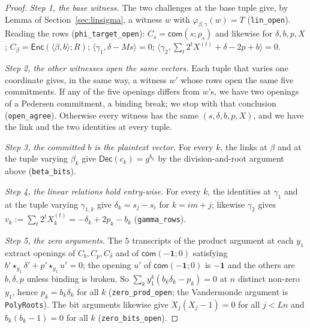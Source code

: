 \documentclass[11pt,a4paper]{article}
\newcommand{\Enc}{\mathsf{Enc}}
\newcommand{\Dec}{\mathsf{Dec}}
\newcommand{\com}{\mathsf{com}}
\newcommand{\rocq}[1]{\texttt{#1}}
\theoremstyle{remark}
\begin{document}
\begin{proof}
\emph{Step 1, the base witness.} The two challenges at the base tuple give,
by Lemma of Section~\ref{sec:linsigma}, a witness $w$ with
$\varphi_{\beta,\gamma}(w) = T$ (\rocq{lin\_open}). Reading the rows
(\rocq{phi\_target\_open}): $C_s = \com(s; \rho_s)$ and likewise for
$\delta, b, p, X$; $C_\beta = \Enc(\langle \beta, b \rangle; R)$; $\langle
\gamma_1, \delta - Ms \rangle = 0$; $\langle \gamma_2, \sum_t 2^t X^{(t)} +
\delta - 2p + b \rangle = 0$.

\emph{Step 2, the other witnesses open the same vectors.} Each tuple that
varies one coordinate gives, in the same way, a witness $w'$ whose rows
open the same five commitments. If any of the five openings differs from
$w$'s, we have two openings of a Pedersen commitment, a binding break; we
stop with that conclusion (\rocq{open\_agree}). Otherwise every witness
has the same $(s, \delta, b, p, X)$, and we have the link and the two
identities at every tuple.

\emph{Step 3, the committed $b$ is the plaintext vector.} For every $k$,
the links at $\beta$ and at the tuple varying $\beta_k$ give $\Dec(c_k) =
g^{b_k}$ by the division-and-root argument above (\rocq{beta\_bits}).

\emph{Step 4, the linear relations hold entry-wise.} For every $k$, the
identities at $\gamma_1$ and at the tuple varying $\gamma_{1,k}$ give
$\delta_k = s_j - s_i$ for $k = im + j$; likewise $\gamma_2$ gives $v_k :=
\sum_t 2^t X^{(t)}_k = -\delta_k + 2 p_k - b_k$ (\rocq{gamma\_rows}).

\emph{Step 5, the zero arguments.} The $5$ transcripts of the product
argument at each $y_1$ extract openings of $C_b, C_p, C_\delta$ and of
$\com(-\mathbf{1}; 0)$ satisfying $b' \star_{y_1} \delta' + p' \star_{y_1}
u' = 0$; the opening $u'$ of $\com(-\mathbf{1}; 0)$ is $-\mathbf{1}$ and the
others are $b, \delta, p$ unless binding is broken. So $\sum_k y_1^{k}
(b_k \delta_k - p_k) = 0$ at $n$ distinct non-zero $y_1$, hence $p_k = b_k
\delta_k$ for all $k$ (\rocq{zero\_prod\_open}; the Vandermonde argument
is \rocq{PolyRoots}). The bit arguments likewise give $X_j (X_j - 1) = 0$
for all $j < Ln$ and $b_k (b_k - 1) = 0$ for all $k$
(\rocq{zero\_bits\_open}).


\end{proof}
\end{document}
